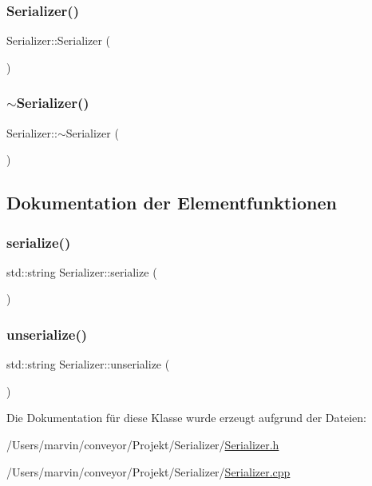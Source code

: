 \subsubsection{\texorpdfstring{Serializer()}{Serializer()}}
{\footnotesize\ttfamily Serializer\+::\+Serializer (\begin{DoxyParamCaption}{ }\end{DoxyParamCaption})}

\hypertarget{class_serializer_a42a7d2d8e622ad1ef5f869813b498aa9}{}\label{class_serializer_a42a7d2d8e622ad1ef5f869813b498aa9} 
\subsubsection{\texorpdfstring{$\sim$\+Serializer()}{~Serializer()}}
{\footnotesize\ttfamily Serializer\+::$\sim$\+Serializer (\begin{DoxyParamCaption}{ }\end{DoxyParamCaption})}



\subsection{Dokumentation der Elementfunktionen}
\hypertarget{class_serializer_a76490c3d7c31f10cd2c991731fd54ac5}{}\label{class_serializer_a76490c3d7c31f10cd2c991731fd54ac5} 
\subsubsection{\texorpdfstring{serialize()}{serialize()}}
{\footnotesize\ttfamily std\+::string Serializer\+::serialize (\begin{DoxyParamCaption}{ }\end{DoxyParamCaption})}

\hypertarget{class_serializer_a55d2d0ca552d5a14b316bab0d8f1590a}{}\label{class_serializer_a55d2d0ca552d5a14b316bab0d8f1590a} 
\subsubsection{\texorpdfstring{unserialize()}{unserialize()}}
{\footnotesize\ttfamily std\+::string Serializer\+::unserialize (\begin{DoxyParamCaption}{ }\end{DoxyParamCaption})}



Die Dokumentation für diese Klasse wurde erzeugt aufgrund der Dateien\+:\begin{DoxyCompactItemize}
\item 
/\+Users/marvin/conveyor/\+Projekt/\+Serializer/\hyperlink{_serializer_8h}{Serializer.\+h}\item 
/\+Users/marvin/conveyor/\+Projekt/\+Serializer/\hyperlink{_serializer_8cpp}{Serializer.\+cpp}\end{DoxyCompactItemize}
